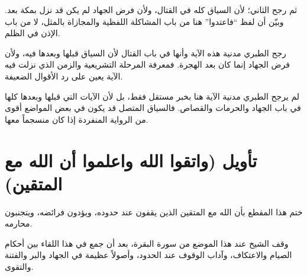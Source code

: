 ثم رجح الثاني؛ لأن السياق كله في القتال، ولأن فرض الجهاد لم يكن قد نزل بمكة بعد. وبيّن أن لفظ ``فاعتدوا'' هنا من باب المشاكلة اللفظية والمجازاة بالمثل، لا من باب الإذن في الظلم.

\begin{fawaid}
رجح الطبري مدنية هذه الآية وأنها في باب القتال لأن السياق قبلها وبعدها فيه، ولأن فرض الجهاد إنما كان بعد الهجرة. فمعرفة المرحلة التشريعية والزمن الذي نزلت فيه الآية يعين على رد الأقوال الضعيفة.
\end{fawaid}

\begin{fawaid}
لم يرجح الطبري مدنية الآية هنا بخبر مستقل فقط، بل لأن الآيات التي قبلها وبعدها كلها في باب الجهاد والحرمات والقصاص. فالسياق المتصل قد يكون في بعض المواضع أقوى من الرواية المنفردة إذا كان منسجماً معها.
\end{fawaid}

\section{تأويل (واتقوا الله واعلموا أن الله مع المتقين)}
ختم  هذا المقطع بأن الله مع المتقين الذين يقفون عند حدوده، ويؤدون فرائضه، ويتجنبون محارمه.

\separator

وقف الشيخ عند هذا الموضع من سورة البقرة، بعد أن جمع في هذا اللقاء بين أحكام الصيام والاعتكاف، وآداب الوقوف عند الحدود، وأصولاً عظيمة في الجهاد والبر والفتنة والتقوى.

